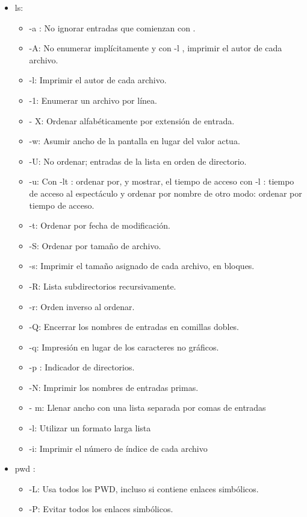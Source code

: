 \documentclass[12pt]{article}
\begin{document}
\begin{itemize}
    \item ls:
    \begin{itemize}
        \item -a : No ignorar entradas que comienzan con .
        \item -A: No enumerar implícitamente y con -l , imprimir el autor de cada archivo.
        \item -l: Imprimir el autor de cada archivo.
        \item -1: Enumerar un archivo por línea.
        \item - X: Ordenar alfabéticamente por extensión de entrada.
        \item -w: Asumir ancho de la pantalla en lugar del valor actua.
        \item -U: No ordenar; entradas de la lista en orden de directorio.
        \item  -u: Con -lt : ordenar por, y mostrar, el tiempo de acceso con -l : tiempo de acceso al espectáculo y ordenar por nombre de otro modo: ordenar por tiempo de acceso.
        \item -t: Ordenar por fecha de modificación.
        \item -S: Ordenar por tamaño de archivo.
        \item -s: Imprimir el tamaño asignado de cada archivo, en bloques.
        \item -R: Lista subdirectorios recursivamente.
        \item -r: Orden inverso al ordenar.
        \item -Q: Encerrar los nombres de entradas en comillas dobles.
        \item -q: Impresión  en lugar de los caracteres no gráficos.
        \item -p : Indicador de directorios.
        \item -N: Imprimir los nombres de entradas primas.
        \item - m: Llenar ancho con una lista separada por comas de entradas
        \item -l: Utilizar un formato larga lista
        \item -i: Imprimir el número de índice de cada archivo
        
    \end{itemize}
    
    \item pwd :
    
    \begin{itemize}
        \item -L: Usa todos los PWD, incluso si contiene enlaces simbólicos.
        \item -P: Evitar todos los enlaces simbólicos.
    \end{itemize}
    

\end{itemize}
\end{document}
